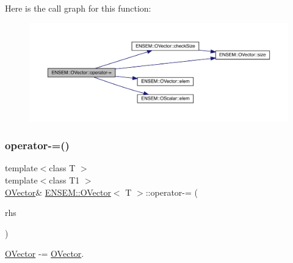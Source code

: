 Here is the call graph for this function\+:
\nopagebreak
\begin{figure}[H]
\begin{center}
\leavevmode
\includegraphics[width=350pt]{d0/d8d/classENSEM_1_1OVector_ae2ae62360c5eb29827cb7e3d5556859f_cgraph}
\end{center}
\end{figure}
\mbox{\label{classENSEM_1_1OVector_ae8a6c2f30368c6713325d05065aec425}} 
\subsubsection{\texorpdfstring{operator-\/=()}{operator-=()}\hspace{0.1cm}{\footnotesize\ttfamily [4/6]}}
{\footnotesize\ttfamily template$<$class T $>$ \\
template$<$class T1 $>$ \\
\mbox{\hyperlink{classENSEM_1_1OVector}{O\+Vector}}\& \mbox{\hyperlink{classENSEM_1_1OVector}{E\+N\+S\+E\+M\+::\+O\+Vector}}$<$ T $>$\+::operator-\/= (\begin{DoxyParamCaption}\item[{const \mbox{\hyperlink{classENSEM_1_1OVector}{O\+Vector}}$<$ T1 $>$ \&}]{rhs }\end{DoxyParamCaption})\hspace{0.3cm}{\ttfamily [inline]}}



\mbox{\hyperlink{classENSEM_1_1OVector}{O\+Vector}} -\/= \mbox{\hyperlink{classENSEM_1_1OVector}{O\+Vector}}. 

